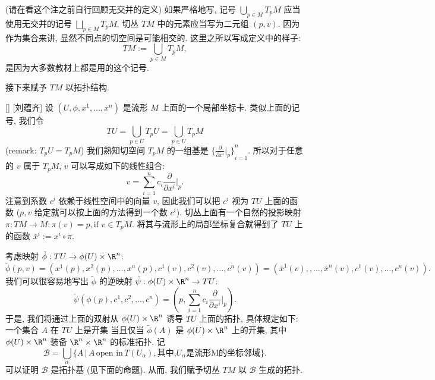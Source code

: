 \documentclass[UTF8]{ctexart}
\begin{document}
        \begin{rmk}
            []
            (请在看这个注之前自行回顾无交并的定义)
            如果严格地写, 记号 \(\displaystyle\bigcup_{p \in M} T_p M\) 应当使用无交并的记号 \(\displaystyle\bigsqcup_{p \in M} T_p M\).  
            切丛 \(T M\) 中的元素应当写为二元组 \((p, v)\). 
            因为作为集合来讲, 显然不同点的切空间是可能相交的. 
            这里之所以写成定义中的样子:
            \[
                TM:= \displaystyle\bigcup_{p \in M} T_p M,
            \]
            是因为大多数教材上都是用的这个记号. 
        \end{rmk}

        接下来赋予 \(TM\) 以拓扑结构. 

        \begin{dfn}
            [tangentbundle]
            {}
            []
            [刘蕴齐]
            设 \((U, \phi, x^1, \dots, x^n)\) 是流形 \(M\) 上面的一个局部坐标卡. 类似上面的记号, 我们令
            \[
                T U = \bigcup_{p \in U} T_p U = \bigcup_{p \in U} T_p M
            \]
            (remark:  \(T_p U = T_p M\)) 我们熟知切空间 \(T_p M\) 的一组基是 \( {\{ \frac{\partial}{\partial x^i} |_p \}}_{i=1}^n \). 所以对于任意的 \(v\) 属于 \(T_p M\),  \(v\) 可以写成如下的线性组合:
            \[
                v = \sum_{i=1}^n c_i \frac{\partial}{\partial x^i}|_p.
            \]
            注意到系数 \(c^i\) 依赖于线性空间中的向量 \(v\), 因此我们可以把 \(c^i\) 视为 \(T U\) 上面的函数 (\(p,v\) 给定就可以按上面的方法得到一个数 \(c^i\)). 
            切丛上面有一个自然的投影映射 \(\pi: T M \to M: \pi(v) = p, \text{if } v \in T_p M\). 将其与流形上的局部坐标复合就得到了 \(T U\) 上的函数 \(\bar{x}^i:= x^i \circ \pi\). 

            考虑映射 \(\tilde{\phi}: T U \to \phi(U) \times \R^n\):
            \[
                \tilde{\phi}(p,v) = (x^1(p),x^2(p), \dots, x^n(p),c^1(v),c^2(v),\dots,c^n(v))=(\bar{x}^1(v),,\dots,\bar{x}^n(v),c^1(v),\dots,c^n(v)).
            \]
            我们可以很容易地写出 \(\tilde{\phi}\) 的逆映射 \(\tilde{\psi}: \phi(U) \times \R^n \to T U\):
            \[
                \tilde{\psi}(\phi(p), c^1, c^2,\dots,c^n)
                = 
                (p, \sum_{i=1}^n c_i \frac{\partial}{\partial x^i}|_p).
            \]
            于是, 我们将通过上面的双射从 \(\phi(U) \times \R^n\) 诱导 \(T U\) 上面的拓扑, 具体规定如下: 一个集合 \(A\) 在 \(T U\) 上是开集 当且仅当  \(\tilde{\phi}(A)\) 是 \(\phi(U) \times \R^n\) 上的开集, 其中 \(\phi(U) \times \R^n\) 装备 \(\R^n \times \R^n\) 的标准拓扑. 
            记
            \[
                \mathcal{B} = \bigcup_{\alpha} \{ A \,|\, A \, \text{open in} \, T(U_{\alpha}), \text{其中,} U_{\alpha} \text{是流形M的坐标邻域} \}.
            \]
            可以证明 \(\mathcal{B}\) 是拓扑基 (见下面的命题). 从而, 我们赋予切丛 \(TM\) 以 \(\mathcal{B}\) 生成的拓扑. 
        \end{dfn}
\end{document}
